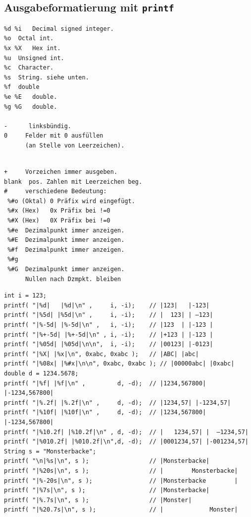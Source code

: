 \documentclass[10pt,a4paper,ngerman,oneside,]{article}
\begin{document}
\subsection{Ausgabeformatierung mit \texttt{printf}}
\begin{verbatim}
%d %i	Decimal signed integer.
%o	Octal int.
%x %X	Hex int.
%u	Unsigned int.
%c	Character.
%s	String.	siehe unten.
%f	double
%e %E	double.
%g %G	double.

-      linksbündig.
0  	  Felder mit 0 ausfüllen 
      (an Stelle von Leerzeichen).
\end{verbatim}
\begin{verbatim}

+	  Vorzeichen immer ausgeben.
blank  pos. Zahlen mit Leerzeichen beg.
# 	  verschiedene Bedeutung:
 %#o (Oktal) 0 Präfix wird eingefügt.
 %#x (Hex)   0x Präfix bei !=0
 %#X (Hex)   0X Präfix bei !=0
 %#e  Dezimalpunkt immer anzeigen.
 %#E  Dezimalpunkt immer anzeigen.
 %#f  Dezimalpunkt immer anzeigen.
 %#g  
 %#G  Dezimalpunkt immer anzeigen. 
      Nullen nach Dzmpkt. bleiben
\end{verbatim}
\begin{verbatim}
int i = 123;
printf( "|%d|   |%d|\n" ,     i, -i);    // |123|   |-123|
printf( "|%5d| |%5d|\n" ,     i, -i);    // |  123| | –123|
printf( "|%-5d| |%-5d|\n" ,   i, -i);    // |123  | |-123 |
printf( "|%+-5d| |%+-5d|\n" , i, -i);    // |+123 | |-123 |
printf( "|%05d| |%05d|\n\n",  i, -i);    // |00123| |-0123|
printf( "|%X| |%x|\n", 0xabc, 0xabc );   // |ABC| |abc|
printf( "|%08x| |%#x|\n\n", 0xabc, 0xabc ); // |00000abc| |0xabc|
double d = 1234.5678;
printf( "|%f| |%f|\n" ,         d, -d);  // |1234,567800| |-1234,567800|
printf( "|%.2f| |%.2f|\n" ,     d, -d);  // |1234,57| |-1234,57|
printf( "|%10f| |%10f|\n" ,     d, -d);  // |1234,567800| |-1234,567800|
printf( "|%10.2f| |%10.2f|\n" , d, -d);  // |   1234,57| |  –1234,57|
printf( "|%010.2f| |%010.2f|\n",d, -d);  // |0001234,57| |-001234,57|
String s = "Monsterbacke";
printf( "\n|%s|\n", s );                 // |Monsterbacke|
printf( "|%20s|\n", s );                 // |        Monsterbacke|
printf( "|%-20s|\n", s );                // |Monsterbacke        |
printf( "|%7s|\n", s );                  // |Monsterbacke|
printf( "|%.7s|\n", s );                 // |Monster|
printf( "|%20.7s|\n", s );               // |             Monster|
\end{verbatim}
\end{document}
